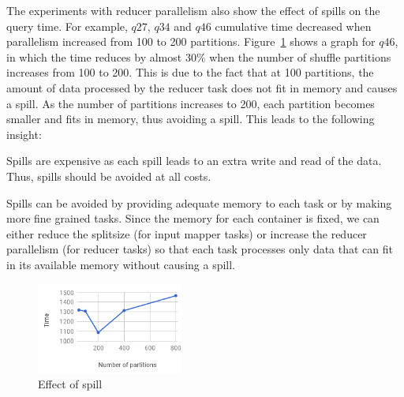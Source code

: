 
The experiments with reducer parallelism also show the effect of spills on the query time. For example, $q27$, $q34$ and $q46$ cumulative time decreased when parallelism increased from 100 to 200 partitions. Figure~\ref{fig:q46} shows a graph for $q46$, in which the time reduces by almost 30\% when the number of shuffle partitions increases from 100 to 200. This is due to the fact that at 100 partitions, the amount of data processed by the reducer task does not fit in memory and causes a spill. As the number of partitions increases to 200, each partition becomes smaller and fits in memory, thus avoiding a spill. This leads to the following insight:
\begin{insight}
	\label{insight:spill}
	Spills are expensive as each spill leads to an extra write and read of the data. Thus, spills should be avoided at all costs.
\end{insight}
Spills can be avoided by providing adequate memory to each task or by making more fine grained tasks. Since the memory for each container is fixed, we can either reduce the splitsize (for input mapper tasks) or increase the reducer parallelism (for reducer tasks) so that each task processes only data that can fit in its available memory without causing a spill.

\begin{figure}[h]
	\centering\includegraphics[height=3cm]{fig/q46.png}
	\caption{Effect of spill}
	\label{fig:q46}
\end{figure}


